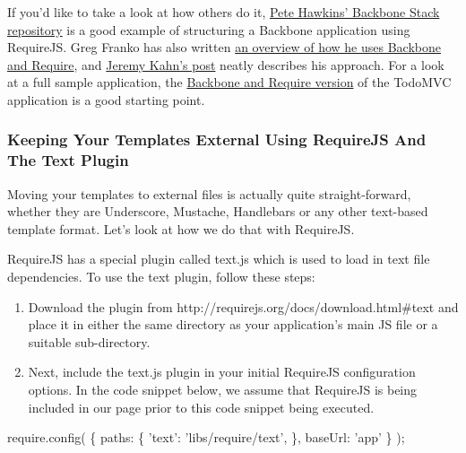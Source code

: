 \documentclass[9pt]{book}
\newenvironment{Shaded}{}{}
\newcommand{\DataTypeTok}[1]{\textcolor[rgb]{0.56,0.13,0.00}{{#1}}}
\newcommand{\StringTok}[1]{\textcolor[rgb]{0.25,0.44,0.63}{{#1}}}
\newcommand{\OtherTok}[1]{\textcolor[rgb]{0.00,0.44,0.13}{{#1}}}
\newcommand{\FunctionTok}[1]{\textcolor[rgb]{0.02,0.16,0.49}{{#1}}}
\newcommand{\NormalTok}[1]{{#1}}
\begin{document}
If you'd like to take a look at how others do it,
\href{https://github.com/phawk/Backbone-Stack}{Pete Hawkins' Backbone
Stack repository} is a good example of structuring a Backbone
application using RequireJS. Greg Franko has also written
\href{http://gregfranko.com/blog/using-backbone-dot-js-with-require-dot-js/}{an
overview of how he uses Backbone and Require}, and
\href{http://jeremyckahn.github.com/blog/2012/08/18/keeping-it-sane-backbone-views-and-require-dot-js/}{Jeremy
Kahn's post} neatly describes his approach. For a look at a full sample
application, the
\href{https://github.com/addyosmani/todomvc/tree/gh-pages/dependency-examples/backbone_require}{Backbone
and Require version} of the TodoMVC application is a good starting
point.

\subsubsection{Keeping Your Templates External Using RequireJS And The
Text
Plugin}\label{keeping-your-templates-external-using-requirejs-and-the-text-plugin}

Moving your templates to external files is actually quite
straight-forward, whether they are Underscore, Mustache, Handlebars or
any other text-based template format. Let's look at how we do that with
RequireJS.

RequireJS has a special plugin called text.js which is used to load in
text file dependencies. To use the text plugin, follow these steps:

\begin{enumerate}
\def\labelenumi{\arabic{enumi}.}
\item
  Download the plugin from http://requirejs.org/docs/download.html\#text
  and place it in either the same directory as your application's main
  JS file or a suitable sub-directory.
\item
  Next, include the text.js plugin in your initial RequireJS
  configuration options. In the code snippet below, we assume that
  RequireJS is being included in our page prior to this code snippet
  being executed.
\end{enumerate}

\begin{Shaded}
\begin{Highlighting}[]
\OtherTok{require}\NormalTok{.}\FunctionTok{config}\NormalTok{( \{}
    \DataTypeTok{paths}\NormalTok{: \{}
        \StringTok{'text'}\NormalTok{: }\StringTok{'libs/require/text'}\NormalTok{,}
    \NormalTok{\},}
    \DataTypeTok{baseUrl}\NormalTok{: }\StringTok{'app'}
\NormalTok{\} );}
\end{Highlighting}
\end{Shaded}
\end{document}
